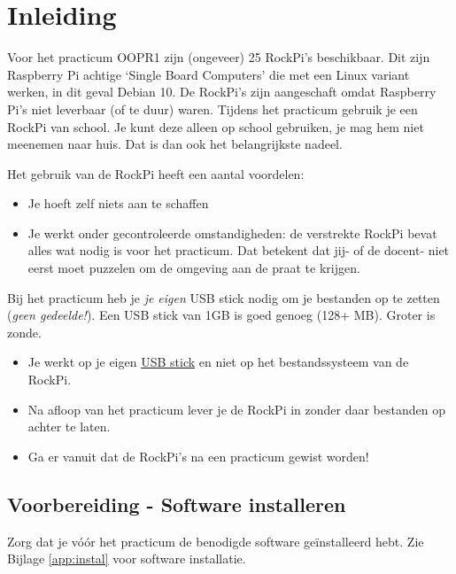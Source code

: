 \chapter{Inleiding}
Voor het practicum OOPR1 zijn (ongeveer) 25 RockPi’s beschikbaar. Dit zijn Raspberry Pi achtige ‘Single Board Computers’ die met een Linux variant werken, in dit geval Debian 10. De RockPi’s zijn aangeschaft omdat Raspberry Pi’s niet leverbaar (of te duur) waren.
Tijdens het practicum gebruik je een RockPi van school. Je kunt deze alleen op school gebruiken, je mag hem niet meenemen naar huis. Dat is dan ook het belangrijkste nadeel.

Het gebruik van de RockPi heeft een aantal voordelen:
\begin{itemize}
\item Je hoeft zelf niets aan te schaffen
\item Je werkt onder gecontroleerde omstandigheden: de verstrekte RockPi bevat alles wat nodig is voor het practicum. Dat betekent dat jij- of de docent- niet eerst moet puzzelen om de omgeving aan de praat te krijgen.
\end{itemize}

\hypertarget{USBinleiding}{}
Bij het practicum heb je \textit{je eigen} USB stick nodig om je bestanden op te zetten (\textit{geen gedeelde!}). Een USB stick van 1GB is goed genoeg (128+ MB). Groter is zonde.
\begin{itemize}
\item Je werkt op je eigen \hyperlink{chp:USBstick}{USB stick} en niet op het bestandssysteem van de RockPi. 
\item Na afloop van het practicum lever je de RockPi in zonder daar bestanden op achter te laten. 
\item Ga er vanuit dat de RockPi’s na een practicum gewist worden!
\end{itemize}

\section{Voorbereiding - Software installeren}
Zorg dat je vóór het practicum de benodigde software geïnstalleerd hebt.
Zie Bijlage \ref{app:instal} voor software installatie.
\newpage

